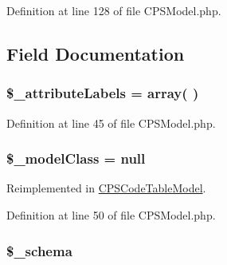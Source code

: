 Definition at line 128 of file CPSModel.php.








\subsection{Field Documentation}
\hypertarget{classCPSModel_a255288ecbb9d5f910b8d9a7c04a34a9b}{
\subsubsection[{\$\_\-attributeLabels}]{\setlength{\rightskip}{0pt plus 5cm}\$\_\-attributeLabels = {\bf array}( )}}
\label{classCPSModel_a255288ecbb9d5f910b8d9a7c04a34a9b}


Definition at line 45 of file CPSModel.php.

\hypertarget{classCPSModel_a90080dcb26627bf719d96ab99e51f958}{
\subsubsection[{\$\_\-modelClass}]{\setlength{\rightskip}{0pt plus 5cm}\$\_\-modelClass = null}}
\label{classCPSModel_a90080dcb26627bf719d96ab99e51f958}


Reimplemented in \hyperlink{classCPSCodeTableModel_a90080dcb26627bf719d96ab99e51f958}{CPSCodeTableModel}.



Definition at line 50 of file CPSModel.php.

\hypertarget{classCPSModel_ad86f0aac1c5254c623bf3a6683ed56e8}{
\subsubsection[{\$\_\-schema}]{\setlength{\rightskip}{0pt plus 5cm}\$\_\-schema}}
\label{classCPSModel_ad86f0aac1c5254c623bf3a6683ed56e8}


